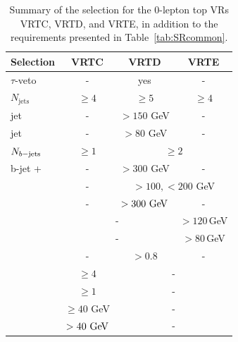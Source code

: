 		\begin{table}[htpb]
		  \caption{Summary of the selection for the $0$-lepton top \acp{VR} VRTC, VRTD, and VRTE, in addition to the requirements presented in Table~\ref{tab:SRcommon}.}
		  \begin{center}
		    \def\arraystretch{1.4}%
		    \begin{tabular}{lccc}
		    \toprule
		      \textbf{Selection}   & \textbf{VRTC}                & \textbf{VRTD}     & \textbf{VRTE}                   \\ \toprule
		      $\tau$-veto          & -                     & yes        & -                        \\ %
		      $N_{\mathrm{jets}}$  & $\ge4$         & $\ge 5$ & $\ge4$       \\ %
		      jet \ptone           & -              & $>150$ GeV & -                        \\ %
		      jet \ptthree         & -              & $>80$ GeV & -                        \\ %
		      $N_{b\mathrm{-jets}}$           & $\ge1$         & \multicolumn{2}{c}{ $\geq 2$  }       \\ %
		      b-jet \ptzero+\ptone & -              & $>300$ GeV & -                        \\ %
		      \midrule
		      \mtbmin              & -              & \multicolumn{2}{c}{ $>100,<200$ GeV  } \\ 
		      \mtbmax              & -              & $>300\gev$ & -                        \\ %
		      \mantikteightzero    & \multicolumn{2}{c}{-} & $>120\,$GeV                           \\ %
		      \mantikteightone     & \multicolumn{2}{c}{-} & $>80\,$GeV                            \\ %
		      \midrule
		      \drbjetbjet          & -              & $>0.8$     & -                        \\ %
		      \nJetS               & $\ge4$         & \multicolumn{2}{c}{-}                 \\ %
		      \nBJetS              & $\ge1$         & \multicolumn{2}{c}{-}                 \\ %
		      \pTSBZero            & $\ge 40$ GeV   & \multicolumn{2}{c}{-}                 \\ %
		      \pTSFour             & $>40\gev$ & \multicolumn{2}{c}{-}                \\ %

\end{tabular}
\end{center}
\end{table}
